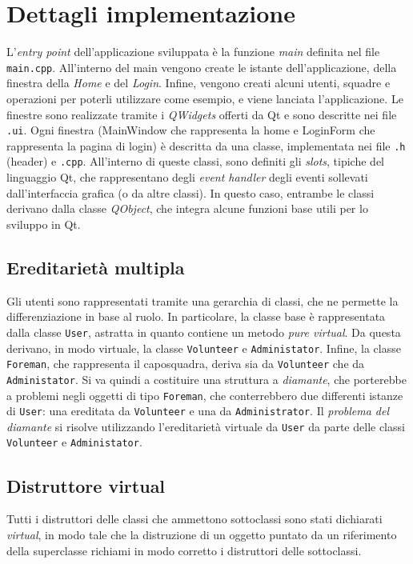 \section{Dettagli implementazione}
L'\textit{entry point} dell'applicazione sviluppata è la funzione \textit{main} definita nel file \texttt{main.cpp}. All'interno del main vengono create le istante dell'applicazione, della finestra della \textit{Home} e del \textit{Login}. Infine, vengono creati alcuni utenti, squadre e operazioni per poterli utilizzare come esempio, e viene lanciata l'applicazione. Le finestre sono realizzate tramite i \textit{QWidgets} offerti da Qt e sono descritte nei file \texttt{.ui}. Ogni finestra (MainWindow che rappresenta la home e LoginForm che rappresenta la pagina di login) è descritta da una classe, implementata nei file \texttt{.h} (header) e \texttt{.cpp}. All'interno di queste classi, sono definiti gli \textit{slots}, tipiche del linguaggio Qt, che rappresentano degli \textit{event handler} degli eventi sollevati dall'interfaccia grafica (o da altre classi). In questo caso, entrambe le classi derivano dalla classe \textit{QObject}, che integra alcune funzioni base utili per lo sviluppo in Qt.

\subsection{Ereditarietà multipla}
Gli utenti sono rappresentati tramite una gerarchia di classi, che ne permette la differenziazione in base al ruolo. In particolare, la classe base è rappresentata dalla classe \texttt{User}, astratta in quanto contiene un metodo \textit{pure virtual}. Da questa derivano, in modo virtuale, la classe \texttt{Volunteer} e \texttt{Administator}. Infine, la classe \texttt{Foreman}, che rappresenta il caposquadra, deriva sia da \texttt{Volunteer} che da \texttt{Administator}. Si va quindi a costituire una struttura a \textit{diamante}, che porterebbe a problemi negli oggetti di tipo \texttt{Foreman}, che conterrebbero due differenti istanze di \texttt{User}: una ereditata da \texttt{Volunteer} e una da \texttt{Administrator}. Il \textit{problema del diamante} si risolve utilizzando l'ereditarietà virtuale da \texttt{User} da parte delle classi \texttt{Volunteer} e \texttt{Administator}.



\subsection{Distruttore virtual}
Tutti i distruttori delle classi che ammettono sottoclassi sono stati dichiarati \textit{virtual}, in modo tale che la distruzione di un oggetto puntato da un riferimento della superclasse richiami in modo corretto i distruttori delle sottoclassi.


